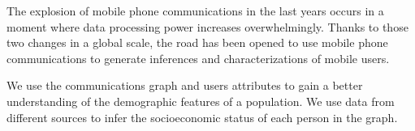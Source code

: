 The explosion of mobile phone communications in the last years occurs in a moment where data processing power increases overwhelmingly.  Thanks to those two changes in a global scale, the road has been opened to use mobile phone communications to generate inferences and characterizations of mobile users.


We use the communications graph and users attributes to gain a better understanding of the demographic features of a population. We use data from different sources to infer the socioeconomic status of each person in the graph.


